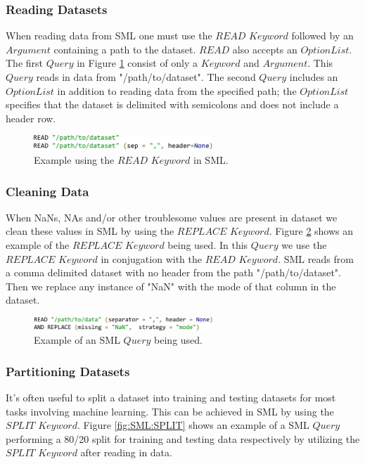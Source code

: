 \documentclass[jair,twoside,11pt,theapa]{article}
\begin{document}
\subsubsection{Reading Datasets}
When reading data from SML one must use the \(READ\) \(Keyword\) followed by an \(Argument\) containing a path to the dataset. \(READ\) also accepts an \(OptionList\). The first \(Query\) in Figure \ref{fig:SML:READ} consist of only a \(Keyword\) and \(Argument\). This \(Query\) reads in data from "/path/to/dataset". The second \(Query\) includes an \(OptionList\) in addition to reading data from the specified path; the \(OptionList\) specifies that the dataset is delimited with semicolons and does not include a header row. 

\begin{figure}
\includegraphics[width=0.6\textwidth]{figs/READ.png}
\centering
\caption{Example using the \(READ\) \(Keyword\) in SML.}
\label{fig:SML:READ}
\end{figure}

\subsubsection{Cleaning Data}
When NaNs, NAs and/or other troublesome values are present in dataset we clean these values in SML by using the \(REPLACE\) \(Keyword\).  Figure \ref{fig:SML:REPLACE}  shows an example of the \(REPLACE\) \(Keyword\) being used. In this \(Query\) we use the \(REPLACE\) \(Keyword\) in conjugation with the \(READ\) \(Keyword\). SML reads from a comma delimited dataset with no header from the path "/path/to/dataset". Then we replace any instance of "NaN" with the mode of that column in the dataset.

\begin{figure}
\includegraphics[width=0.6\textwidth]{figs/REPLACE.png}
\centering
\caption{Example of an SML \(Query\) being used.}
\label{fig:SML:REPLACE}
\end{figure}

\subsubsection{Partitioning Datasets}
It's often useful to split a dataset into training and testing datasets for most tasks involving machine learning. This can be achieved in SML by using the \(SPLIT\) \(Keyword\). Figure \ref{fig:SML:SPLIT} shows an example of a SML \(Query\) performing a 80/20 split for training and testing data respectively by utilizing the \(SPLIT\) \(Keyword\) after reading in data.
\end{document}
